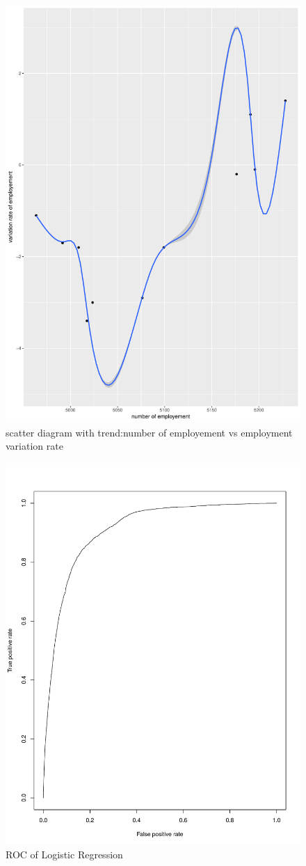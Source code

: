 \documentclass[12pt, a4paper, bibliography=totoc, english]{scrartcl}
\begin{document}
\begin{figure}
	\centering
	\includegraphics[width=0.7\linewidth]{Plot11}
	\caption{scatter diagram with trend:number of employement vs employment variation rate}
	\label{fig:plot11}
\end{figure}




\begin{figure}
	\centering
	\includegraphics[width=0.7\linewidth]{ROC_lr}
	\caption{ROC of Logistic Regression}
	\label{fig:roclr}
\end{figure}
\end{document}
